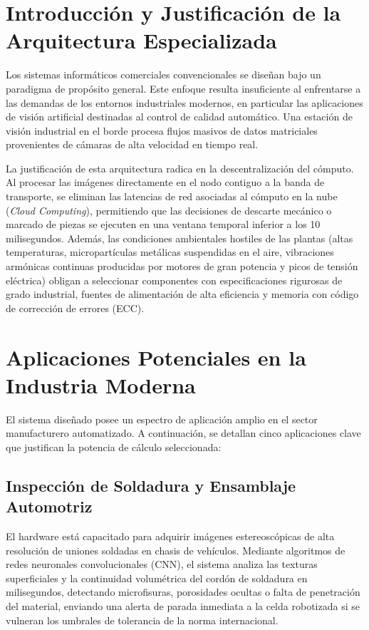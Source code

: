 \documentclass[12pt,letterpaper]{article}
\begin{document}
\section{Introducción y Justificación de la Arquitectura Especializada}
Los sistemas informáticos comerciales convencionales se diseñan bajo un paradigma de propósito general. Este enfoque resulta insuficiente al enfrentarse a las demandas de los entornos industriales modernos, en particular las aplicaciones de visión artificial destinadas al control de calidad automático. Una estación de visión industrial en el borde procesa flujos masivos de datos matriciales provenientes de cámaras de alta velocidad en tiempo real. 

La justificación de esta arquitectura radica en la descentralización del cómputo. Al procesar las imágenes directamente en el nodo contiguo a la banda de transporte, se eliminan las latencias de red asociadas al cómputo en la nube (\textit{Cloud Computing}), permitiendo que las decisiones de descarte mecánico o marcado de piezas se ejecuten en una ventana temporal inferior a los 10 milisegundos. Además, las condiciones ambientales hostiles de las plantas (altas temperaturas, micropartículas metálicas suspendidas en el aire, vibraciones armónicas continuas producidas por motores de gran potencia y picos de tensión eléctrica) obligan a seleccionar componentes con especificaciones rigurosas de grado industrial, fuentes de alimentación de alta eficiencia y memoria con código de corrección de errores (ECC).

\section{Aplicaciones Potenciales en la Industria Moderna}
El sistema diseñado posee un espectro de aplicación amplio en el sector manufacturero automatizado. A continuación, se detallan cinco aplicaciones clave que justifican la potencia de cálculo seleccionada:

\subsection{Inspección de Soldadura y Ensamblaje Automotriz}
El hardware está capacitado para adquirir imágenes estereoscópicas de alta resolución de uniones soldadas en chasis de vehículos. Mediante algoritmos de redes neuronales convolucionales (CNN), el sistema analiza las texturas superficiales y la continuidad volumétrica del cordón de soldadura en milisegundos, detectando microfisuras, porosidades ocultas o falta de penetración del material, enviando una alerta de parada inmediata a la celda robotizada si se vulneran los umbrales de tolerancia de la norma internacional.
\end{document}
